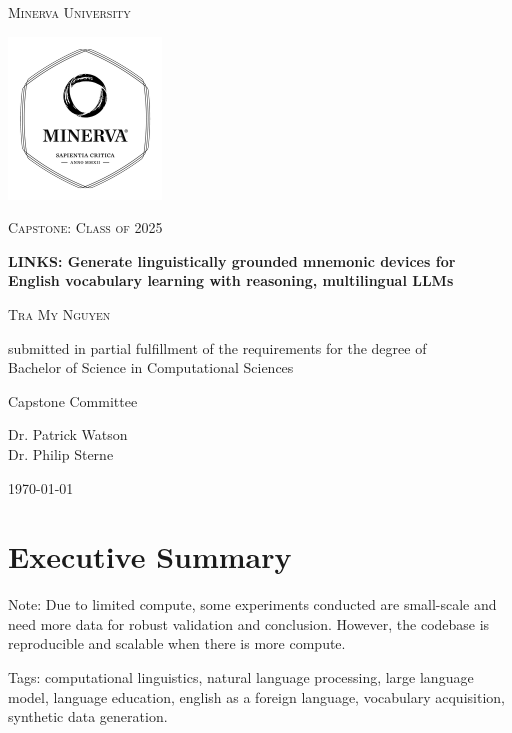 
\begin{titlepage}
\centering
{\scshape\LARGE Minerva University \par}
\vspace{1cm}
\begin{center}
  \includegraphics[width=0.4\linewidth]{preamble/minerva_logo.pdf}
\end{center}
{\scshape\Large Capstone: Class of 2025 \par}
\vspace{1.5cm}
{\huge\bfseries LINKS: Generate linguistically grounded mnemonic devices for English vocabulary learning with reasoning, multilingual LLMs \par}
\vspace{2cm}
{\scshape\large Tra My Nguyen \par}

\vfill
submitted in partial fulfillment of the requirements for the degree of \\ Bachelor of Science in Computational Sciences \par
\vspace{2cm}
{\large Capstone Committee \par}
Dr. Patrick Watson \\
Dr. Philip Sterne \\
\vspace{2cm}
{\large \today\par}
\end{titlepage}

\onecolumn
\section*{Executive Summary}
Note: Due to limited compute, some experiments conducted are small-scale and need more data for robust validation and conclusion. However, the codebase is reproducible and scalable when there is more compute.

Tags: computational linguistics, natural language processing, large language model, language education, english as a foreign language, vocabulary acquisition, synthetic data generation.

\clearpage

\tableofcontents
